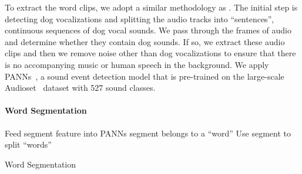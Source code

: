 To extract the word clips, we adopt a similar methodology as \citet{jieyiacl2023}. The initial step is detecting dog vocalizations and splitting the audio tracks into ``sentences'', continuous sequences of dog vocal sounds. We pass through the frames of audio and determine whether they contain dog sounds. If so, we extract these audio clips and then we remove noise other than dog vocalizations to ensure that there is no accompanying music or human speech in the background. We apply PANNs~\cite{kong2020panns}, a sound event detection model that is pre-trained on the large-scale Audioset~\cite{gemmeke2017audio} dataset with 527 sound classes. 





\paragraph{Word Segmentation}
\begin{algorithm}[]
  \SetAlgoLined

  {
    Feed segment feature into PANNs\;
    {
      segment belongs to a ``word''\;
    }
	{
      Use segment to split ``words''\;
  }
  }
  \caption{Word Segmentation}
\end{algorithm}


